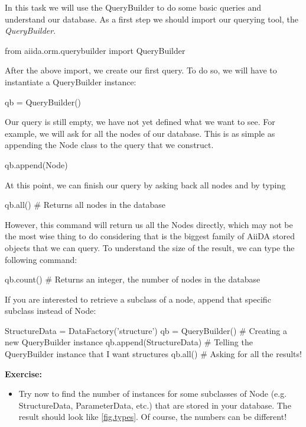 In this task we will use the QueryBuilder to do some basic queries and understand our database.
As a first step we should import our querying tool, the \textit{QueryBuilder}.
\begin{pythoncommand}
from aiida.orm.querybuilder import QueryBuilder
\end{pythoncommand}
After the above import, we create our first query.
To do so, we will have to instantiate a QueryBuilder instance:
\begin{pythoncommand}
qb = QueryBuilder()
\end{pythoncommand}
Our query is still empty, we have not yet defined what we want to see.
For example, we will ask for all the nodes of our database.
This is as simple as appending the Node class to the query that we construct.
\begin{pythoncommand}
qb.append(Node)
\end{pythoncommand}
At this point, we can finish our query by asking back all nodes and by typing
\begin{pythoncommand}
qb.all()        # Returns all nodes in the database
\end{pythoncommand}
However, this command will return us all the Nodes directly, which may not be the most wise thing to do
considering that is the biggest family of AiiDA stored objects that we can query.
To understand the size of the result, we can type the following command:
\begin{pythoncommand}
qb.count()      # Returns an integer, the number of nodes in the database
\end{pythoncommand}
If you are interested to retrieve a subclass of a node, append that specific subclass instead of Node:
\begin{pythoncommand}
StructureData = DataFactory('structure')
qb = QueryBuilder()         # Creating a new QueryBuilder instance
qb.append(StructureData)    # Telling the QueryBuilder instance that I want structures
qb.all()                    # Asking for all the results!
\end{pythoncommand}


\begin{tcolorbox}
\textbf{Exercise:}
\begin{itemize}
\item
Try now to find the number of instances for some subclasses of Node (e.g. StructureData, ParameterData, etc.)
that are stored in your database.
The result should look like \autoref{fig.types}.
Of course, the numbers can be different!
\end{itemize}
\end{tcolorbox}

